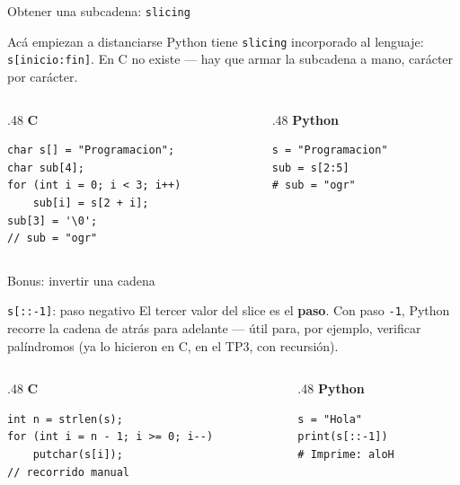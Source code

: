 \documentclass{beamer}
\begin{document}
\begin{frame}[fragile]{Obtener una subcadena: \texttt{slicing}}
  \begin{block}{Acá empiezan a distanciarse}
    Python tiene \texttt{slicing} incorporado al lenguaje:
    \texttt{s[inicio:fin]}. En C no existe — hay que armar la subcadena a
    mano, carácter por carácter.
  \end{block}
  \begin{columns}[T]
    \begin{column}{.48\textwidth}
      \centering\textbf{C}
      \begin{verbatim}
char s[] = "Programacion";
char sub[4];
for (int i = 0; i < 3; i++)
    sub[i] = s[2 + i];
sub[3] = '\0';
// sub = "ogr"
      \end{verbatim}
    \end{column}
    \begin{column}{.48\textwidth}
      \centering\textbf{Python}
      \begin{verbatim}
s = "Programacion"
sub = s[2:5]
# sub = "ogr"
      \end{verbatim}
    \end{column}
  \end{columns}
\end{frame}

\begin{frame}[fragile]{Bonus: invertir una cadena}
  \begin{block}{\texttt{s[::-1]}: paso negativo}
    El tercer valor del slice es el \textbf{paso}. Con paso \texttt{-1},
    Python recorre la cadena de atrás para adelante — útil para, por
    ejemplo, verificar palíndromos (ya lo hicieron en C, en el TP3, con
    recursión).
  \end{block}
  \begin{columns}[T]
    \begin{column}{.48\textwidth}
      \centering\textbf{C}
      \begin{verbatim}
int n = strlen(s);
for (int i = n - 1; i >= 0; i--)
    putchar(s[i]);
// recorrido manual
      \end{verbatim}
    \end{column}
    \begin{column}{.48\textwidth}
      \centering\textbf{Python}
      \begin{verbatim}
s = "Hola"
print(s[::-1])
# Imprime: aloH
      \end{verbatim}
    \end{column}
  \end{columns}
\end{frame}
\end{document}
